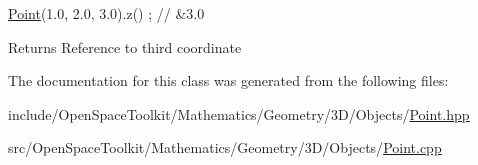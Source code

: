 \begin{DoxyCode}
\hyperlink{classostk_1_1math_1_1geom_1_1d3_1_1objects_1_1_point_ad9bee5dadb878200f859b20a34680ae5}{Point}(1.0, 2.0, 3.0).z() ; \textcolor{comment}{// &3.0}
\end{DoxyCode}


\begin{DoxyReturn}{Returns}
Reference to third coordinate 
\end{DoxyReturn}


The documentation for this class was generated from the following files\+:\begin{DoxyCompactItemize}
\item 
include/\+Open\+Space\+Toolkit/\+Mathematics/\+Geometry/3\+D/\+Objects/\hyperlink{3_d_2_objects_2_point_8hpp}{Point.\+hpp}\item 
src/\+Open\+Space\+Toolkit/\+Mathematics/\+Geometry/3\+D/\+Objects/\hyperlink{3_d_2_objects_2_point_8cpp}{Point.\+cpp}\end{DoxyCompactItemize}
